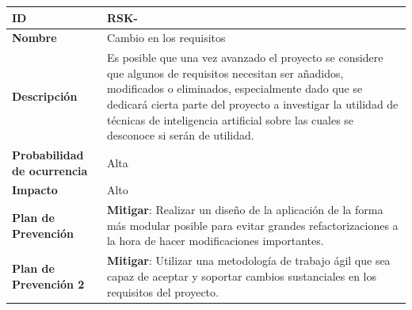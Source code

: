 \begin{center}
	\begin{tabular}{ | p{5.6cm} | p{8.5cm} | } 
		\hline
		
		\textbf{ID} & RSK-\arabic{contador_riesgos}
		{contador_riesgos} \\
		
		\hline 
		\textbf{Nombre} &
		Cambio en los requisitos\\ 
		
		\hline
		\textbf{Descripción} & 
		Es posible que una vez avanzado el proyecto se considere que algunos de requisitos necesitan ser añadidos, modificados o eliminados, especialmente dado que se dedicará cierta parte del proyecto a investigar la utilidad de técnicas de inteligencia artificial sobre las cuales se desconoce si serán de utilidad.\\
		
		\hline 
		\textbf{Probabilidad de ocurrencia} &
		Alta\\
		
		\hline 
		\textbf{Impacto} &
		Alto\\
		
		\hline 
		\textbf{Plan de Prevención} &
		\textbf{Mitigar}: Realizar un diseño de la aplicación de la forma más modular posible para evitar grandes refactorizaciones a la hora de hacer modificaciones importantes.\\
		
		\hline 
		\textbf{Plan de Prevención 2} &
		\textbf{Mitigar}: Utilizar una metodología de trabajo ágil que sea capaz de aceptar y soportar cambios sustanciales en los requisitos del proyecto.\\
		
		
		\hline
	\end{tabular}
\end{center}

